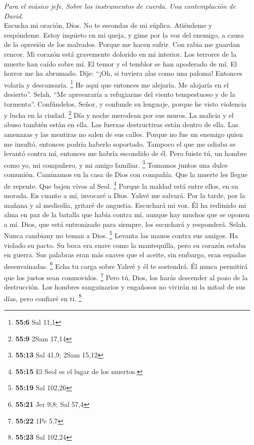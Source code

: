 \begin{paracol}{2}
\emph{Para el músico jefe. Sobre los instrumentos de cuerda. Una
contemplación de David.}\\
 Escucha mi oración, Dios. No te escondas de mi súplica.
 Atiéndeme y respóndeme. Estoy inquieto en mi queja, y
gime  por la voz del enemigo, a causa de la opresión de
los malvados. Porque me hacen sufrir. Con rabia me guardan rencor.
 Mi corazón está gravemente dolorido en mi interior. Los
terrores de la muerte han caído sobre mí.  El temor y el
temblor se han apoderado de mí. El horror me ha abrumado. 
Dije: ``¡Oh, si tuviera alas como una paloma! Entonces volaría y
descansaría. \footnote{\textbf{55:6} Sal 11,1}  He aquí
que entonces me alejaría. Me alojaría en el desierto''. Selah.
 ``Me apresuraría a refugiarme del viento tempestuoso y de
la tormenta''.  Confúndelos, Señor, y confunde su
lenguaje, porque he visto violencia y lucha en la ciudad. \footnote{\textbf{55:9}
  2Sam 17,14}  Día y noche merodean por sus muros. La
malicia y el abuso también están en ella.  Las fuerzas
destructivas están dentro de ella. Las amenazas y las mentiras no salen
de sus calles.  Porque no fue un enemigo quien me
insultó, entonces podría haberlo soportado. Tampoco el que me odiaba se
levantó contra mí, entonces me habría escondido de él. 
Pero fuiste tú, un hombre como yo, mi compañero, y mi amigo familiar.
\footnote{\textbf{55:13} Sal 41,9; 2Sam 15,12}  Tomamos
juntos una dulce comunión. Caminamos en la casa de Dios con compañía.
 Que la muerte les llegue de repente. Que bajen vivos al
Seol. \footnote{\textbf{55:15} El Seol es el lugar de los muertos.}
Porque la maldad está entre ellos, en su morada.  En
cuanto a mí, invocaré a Dios. Yahvé me salvará.  Por la
tarde, por la mañana y al mediodía, gritaré de angustia. Escuchará mi
voz.  Él ha redimido mi alma en paz de la batalla que
había contra mí, aunque hay muchos que se oponen a mí. 
Dios, que está entronizado para siempre, los escuchará y responderá.
Selah. Nunca cambiany no teman a Dios. \footnote{\textbf{55:19} Sal
  102,26}  Levanta las manos contra sus amigos. Ha
violado su pacto.  Su boca era suave como la mantequilla,
pero su corazón estaba en guerra. Sus palabras eran más suaves que el
aceite, sin embargo, eran espadas desenvainadas. \footnote{\textbf{55:21}
  Jer 9,8; Sal 57,4}  Echa tu carga sobre Yahvé y él te
sostendrá. Él nunca permitirá que los justos sean conmovidos.
\footnote{\textbf{55:22} 1Pe 5,7}  Pero tú, Dios, los
harás descender al pozo de la destrucción. Los hombres sanguinarios y
engañosos no vivirán ni la mitad de sus días, pero confiaré en ti.
\footnote{\textbf{55:23} Sal 102,24}


\end{paracol}
